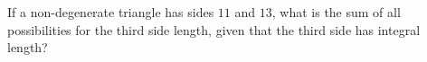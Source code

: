 If a non-degenerate triangle has sides $11$ and $13$, what is the sum of all possibilities for the third side length, given that the third side has integral length?
